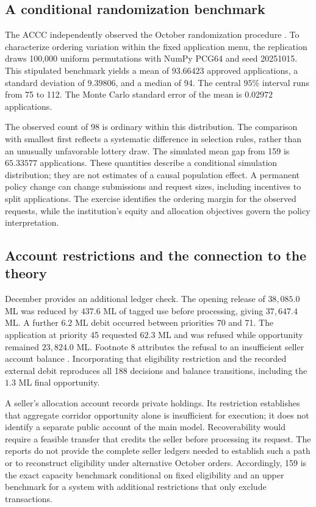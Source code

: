 \documentclass[ecta,draft,supplement]{econsocart}
\theoremstyle{definition}
\theoremstyle{definition}
\begin{document}
\begin{appendix}
\subsection{A conditional randomization benchmark}

The ACCC independently observed the October randomization procedure
\citep{ACCC2025October}. To characterize ordering variation within the
fixed application menu, the replication draws 100,000 uniform
permutations with NumPy PCG64 and seed 20251015. This stipulated
benchmark yields a mean of $93.66423$ approved applications, a standard
deviation of $9.39806$, and a median of 94. The central $95\%$ interval
runs from 75 to 112. The Monte Carlo standard error of the mean is
$0.02972$ applications.

The observed count of 98 is ordinary within this distribution. The
comparison with smallest first reflects a systematic difference in
selection rules, rather than an unusually unfavorable lottery draw.
The simulated mean gap from 159 is $65.33577$ applications. These
quantities describe a conditional simulation distribution; they are not
estimates of a causal population effect. A permanent policy change can
change submissions and request sizes, including incentives to split
applications. The exercise identifies the ordering margin for the
observed requests, while the institution's equity and allocation
objectives govern the policy interpretation.

\subsection{Account restrictions and the connection to the theory}

December provides an additional ledger check. The opening release of
$38,085.0$ ML was reduced by $437.6$ ML of tagged use before processing,
giving $37,647.4$ ML. A further $6.2$ ML debit occurred between priorities
70 and 71. The application at priority 45 requested $62.3$ ML and was
refused while opportunity remained $23,824.0$ ML. Footnote 8 attributes
the refusal to an insufficient seller account balance
\citep{DEECA2025December}. Incorporating that eligibility restriction
and the recorded external debit reproduces all 188 decisions and balance
transitions, including the $1.3$ ML final opportunity.

A seller's allocation account records private holdings. Its restriction
establishes that aggregate corridor opportunity alone is insufficient
for execution; it does not identify a separate public account of the
main model. Recoverability would require a feasible transfer that
credits the seller before processing its request. The reports do not
provide the complete seller ledgers needed to establish such a path
or to reconstruct eligibility under alternative October orders.
Accordingly, 159 is the exact capacity benchmark conditional on fixed
eligibility and an upper benchmark for a system with additional
restrictions that only exclude transactions.


\end{appendix}
\end{document}
